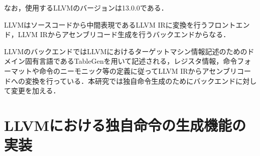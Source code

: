 ﻿\documentclass[a4j]{jarticle}
\begin{document}
なお，使用するLLVMのバージョンは13.0.0である．

LLVMはソースコードから中間表現であるLLVM IRに変換を行うフロントエンド，LLVM IRからアセンブリコード生成を行うバックエンドからなる．





LLVMのバックエンドではLLVMにおけるターゲットマシン情報記述のためのドメイン固有言語であるTableGenを用いて記述される，レジスタ情報，命令フォーマットや命令のニーモニック等の定義に従ってLLVM IRからアセンブリコードへの変換を行っている．本研究では独自命令生成のためにバックエンドに対して変更を加える．



\section{LLVMにおける独自命令の生成機能の実装}
\end{document}
